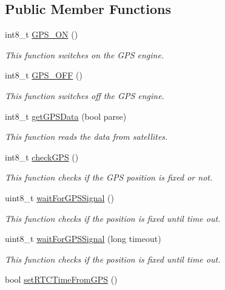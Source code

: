 \subsection*{Public Member Functions}
\begin{DoxyCompactItemize}
\item 
int8\+\_\+t \hyperlink{class_wasp_g_p_r_s___s_i_m928_a_a5560ac35ec706377295b153596d53a84}{G\+P\+S\+\_\+\+ON} ()
\begin{DoxyCompactList}\small\item\em This function switches on the G\+PS engine. \end{DoxyCompactList}\item 
int8\+\_\+t \hyperlink{class_wasp_g_p_r_s___s_i_m928_a_a444ff94882e0feb71a71c88a5cfe6182}{G\+P\+S\+\_\+\+O\+FF} ()
\begin{DoxyCompactList}\small\item\em This function switches off the G\+PS engine. \end{DoxyCompactList}\item 
int8\+\_\+t \hyperlink{class_wasp_g_p_r_s___s_i_m928_a_a62bbac97f7bf942c9d37a79c34f3f246}{get\+G\+P\+S\+Data} (bool parse)
\begin{DoxyCompactList}\small\item\em This function reads the data from satellites. \end{DoxyCompactList}\item 
int8\+\_\+t \hyperlink{class_wasp_g_p_r_s___s_i_m928_a_af163f1823ea22c9acf5ff293b98d072d}{check\+G\+PS} ()
\begin{DoxyCompactList}\small\item\em This function checks if the G\+PS position is fixed or not. \end{DoxyCompactList}\item 
uint8\+\_\+t \hyperlink{class_wasp_g_p_r_s___s_i_m928_a_a621bd6fa71bc512a9b83190c1b136f31}{wait\+For\+G\+P\+S\+Signal} ()
\begin{DoxyCompactList}\small\item\em This function checks if the position is fixed until time out. \end{DoxyCompactList}\item 
uint8\+\_\+t \hyperlink{class_wasp_g_p_r_s___s_i_m928_a_a84b067680414d55d9a2f11677f863d55}{wait\+For\+G\+P\+S\+Signal} (long timeout)
\begin{DoxyCompactList}\small\item\em This function checks if the position is fixed until time out. \end{DoxyCompactList}\item 
bool \hyperlink{class_wasp_g_p_r_s___s_i_m928_a_aeaf42dc745e86a3471c030facea54a0c}{set\+R\+T\+C\+Time\+From\+G\+PS} ()
\end{DoxyCompactItemize}

